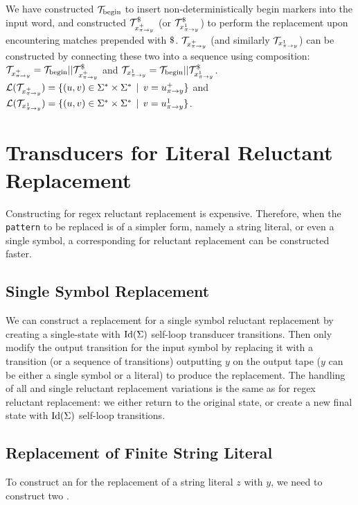 We have constructed $\mathcal{T}_{\text{begin}}$ to insert non-deterministically begin markers into the input word, and constructed $\mathcal{T}^\$_{x^{+}_{\pi \rightarrow y}}$ (or $\mathcal{T}^\$_{x^{1}_{\pi \rightarrow y}}$) to perform the replacement upon encountering matches prepended with $\marker$.
$\mathcal{T}_{x^{+}_{\pi \rightarrow y}}$ (and similarly $\mathcal{T}_{x^{1}_{\pi \rightarrow y}}$) can be constructed by connecting these two \nfts into a sequence using composition: $\mathcal{T}_{x^{+}_{\pi \rightarrow y}} = \mathcal{T}_{\text{begin}} || \mathcal{T}^\$_{x^{+}_{\pi \rightarrow y}}$ and $\mathcal{T}_{x^{1}_{\pi \rightarrow y}} = \mathcal{T}_{\text{begin}} || \mathcal{T}^\$_{x^{1}_{\pi \rightarrow y}}$.
$\mathcal{L}(\mathcal{T}_{x^{+}_{\pi \rightarrow y}}) = \{ (u, v) \in \Sigma^* \times \Sigma^* \,\mid\, v = u^{+}_{\pi \rightarrow y} \} $ and $\mathcal{L}(\mathcal{T}_{x^{1}_{\pi \rightarrow y}}) = \{ (u, v) \in \Sigma^* \times \Sigma^* \,\mid\, v = u^{1}_{\pi \rightarrow y} \} $.

\section{Transducers for Literal Reluctant Replacement}

Constructing \nfts for regex reluctant replacement is expensive.
Therefore, when the \texttt{pattern} to be replaced is of a simpler form, namely a string literal, or even a single symbol, a corresponding \nft for reluctant replacement can be constructed faster.

\subsection{Single Symbol Replacement}

We can construct a replacement \dft for a single symbol reluctant replacement by creating a single-state \dft with $\text{Id}(\Sigma)$ self-loop transducer transitions.
Then only modify the output transition for the input symbol by replacing it with a transition (or a sequence of transitions) outputting $y$ on the output tape ($y$ can be either a single symbol or a literal) to produce the replacement.
The handling of all and single reluctant replacement variations is the same as for regex reluctant replacement: we either return to the original state, or create a new final state with $\text{Id}(\Sigma)$ self-loop transitions.

\subsection{Replacement of Finite String Literal}

To construct an \nft for the replacement of a string literal $z$ with $y$, we need to construct two \nfts.

